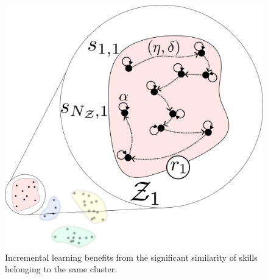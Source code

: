\begin{figure}[!t]
	\centering
	\includegraphics[width=0.95\columnwidth]{fig/intra_skill_learning.png}
	\caption{Incremental learning benefits from the significant similarity of skills belonging to the same cluster.}
	\label{fig:intra_skill_learning}
\end{figure}
